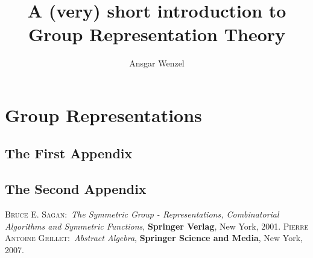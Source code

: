 \documentclass[a4paper,12pt,reqno]{amsbook}%
\theoremstyle{plain}
\numberwithin{equation}{section}
\begin{document}
\frontmatter
\title[Group Representation Theory]{A (very) short introduction to Group Representation Theory}
\author[A. Wenzel]{Ansgar Wenzel}
\address[]{Chichester, 3R400%
\hspace*{\fill}\linebreak\indent%
University of Sussex}%

\maketitle
\tableofcontents



\mainmatter

\part{Group Representations}



\backmatter \appendix

\chapter{The First Appendix}


\chapter{The Second Appendix}


\begin{thebibliography}{9}
 \textsc{Bruce E. Sagan}:\ \textit{The Symmetric Group - Representations, Combinatorial Algorithms and Symmetric Functions}, \textbf{Springer Verlag}, New York, 2001.
 \textsc{Pierre Antoine Grillet}:\ \textit{Abstract Algebra}, \textbf{Springer Science and Media}, New York, 2007.
\end{thebibliography}
\end{document}
